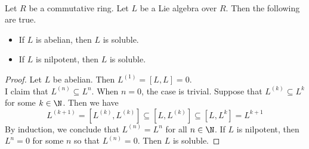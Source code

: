 \documentclass[a4paper]{article}
\begin{document}
\begin{lmm}{}{}\\
Let $R$ be a commutative ring. Let $L$ be a Lie algebra over $R$. Then the following are true. 
\begin{itemize}
\item If $L$ is abelian, then $L$ is soluble. 
\item If $L$ is nilpotent, then $L$ is soluble. 
\end{itemize} 
\begin{proof}
Let $L$ be abelian. Then $L^{(1)}=[L,L]=0$. \\

I claim that $L^{(n)}\subseteq L^n$. When $n=0$, the case is trivial. Suppose that $L^{(k)}\subseteq L^k$ for some $k\in\N$. Then we have $$L^{(k+1)}=[L^{(k)},L^{(k)}]\subseteq[L,L^{(k)}]\subseteq[L,L^k]=L^{k+1}$$ By induction, we conclude that $L^{(n)}=L^n$ for all $n\in\N$. If $L$ is nilpotent, then $L^n=0$ for some $n$ so that $L^{(n)}=0$. Then $L$ is soluble. 
\end{proof}
\end{lmm}
\end{document}
